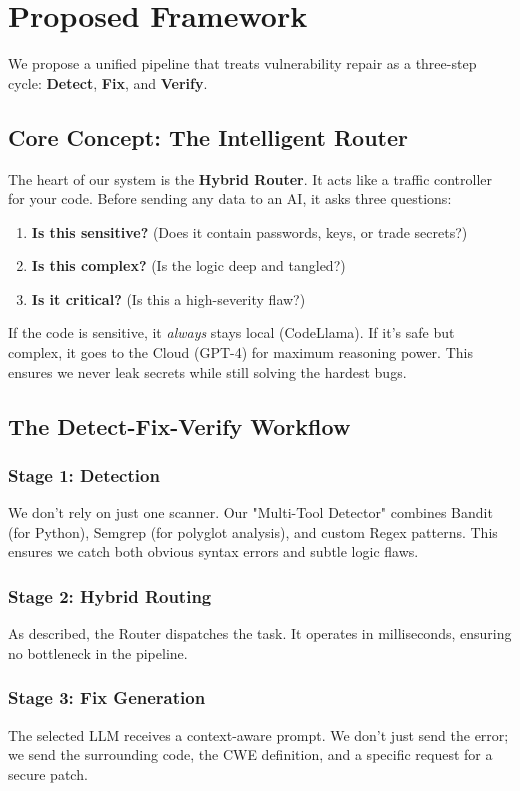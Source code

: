 \documentclass[conference]{IEEEtran}
\begin{document}
\section{Proposed Framework}

We propose a unified pipeline that treats vulnerability repair as a three-step cycle: \textbf{Detect}, \textbf{Fix}, and \textbf{Verify}.

\subsection{Core Concept: The Intelligent Router}
The heart of our system is the \textbf{Hybrid Router}. It acts like a traffic controller for your code. Before sending any data to an AI, it asks three questions:
\begin{enumerate}
    \item \textbf{Is this sensitive?} (Does it contain passwords, keys, or trade secrets?)
    \item \textbf{Is this complex?} (Is the logic deep and tangled?)
    \item \textbf{Is it critical?} (Is this a high-severity flaw?)
\end{enumerate}
If the code is sensitive, it \textit{always} stays local (CodeLlama). If it's safe but complex, it goes to the Cloud (GPT-4) for maximum reasoning power. This ensures we never leak secrets while still solving the hardest bugs.

\subsection{The Detect-Fix-Verify Workflow}

\subsubsection{Stage 1: Detection}
We don't rely on just one scanner. Our "Multi-Tool Detector" combines Bandit (for Python), Semgrep (for polyglot analysis), and custom Regex patterns. This ensures we catch both obvious syntax errors and subtle logic flaws.

\subsubsection{Stage 2: Hybrid Routing}
As described, the Router dispatches the task. It operates in milliseconds, ensuring no bottleneck in the pipeline.

\subsubsection{Stage 3: Fix Generation}
The selected LLM receives a context-aware prompt. We don't just send the error; we send the surrounding code, the CWE definition, and a specific request for a secure patch.
\end{document}

